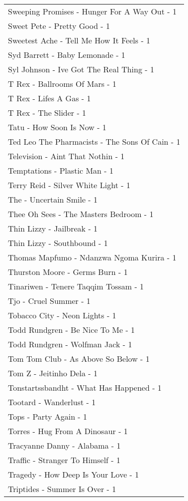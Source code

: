 \documentclass[
]{article}
\begin{document}
\begin{longtable}{l}
Sweeping Promises - Hunger For A Way Out - 1 \\ 
Sweet Pete - Pretty Good - 1 \\ 
Sweetest Ache - Tell Me How It Feels - 1 \\ 
Syd Barrett - Baby Lemonade - 1 \\ 
Syl Johnson - Ive Got The Real Thing - 1 \\ 
T Rex - Ballrooms Of Mars - 1 \\ 
T Rex - Lifes A Gas - 1 \\ 
T Rex - The Slider - 1 \\ 
Tatu - How Soon Is Now - 1 \\ 
Ted Leo The Pharmacists - The Sons Of Cain - 1 \\ 
Television - Aint That Nothin - 1 \\ 
Temptations - Plastic Man - 1 \\ 
Terry Reid - Silver White Light - 1 \\ 
The - Uncertain Smile - 1 \\ 
Thee Oh Sees - The Masters Bedroom - 1 \\ 
Thin Lizzy - Jailbreak - 1 \\ 
Thin Lizzy - Southbound - 1 \\ 
Thomas Mapfumo - Ndanzwa Ngoma Kurira - 1 \\ 
Thurston Moore - Germs Burn - 1 \\ 
Tinariwen - Tenere Taqqim Tossam - 1 \\ 
Tjo - Cruel Summer - 1 \\ 
Tobacco City - Neon Lights - 1 \\ 
Todd Rundgren - Be Nice To Me - 1 \\ 
Todd Rundgren - Wolfman Jack - 1 \\ 
Tom Tom Club - As Above So Below - 1 \\ 
Tom Z - Jeitinho Dela - 1 \\ 
Tonstartssbandht - What Has Happened - 1 \\ 
Tootard - Wanderlust - 1 \\ 
Tops - Party Again - 1 \\ 
Torres - Hug From A Dinosaur - 1 \\ 
Tracyanne Danny - Alabama - 1 \\ 
Traffic - Stranger To Himself - 1 \\ 
Tragedy - How Deep Is Your Love - 1 \\ 
Triptides - Summer Is Over - 1 \\ 

\end{longtable}
\end{document}
